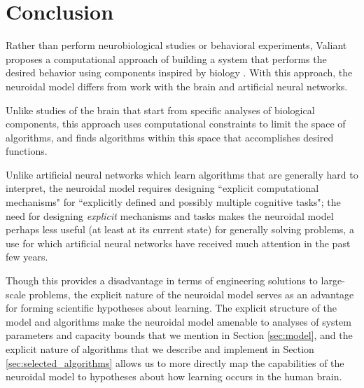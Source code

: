 \documentclass[letterpaper, 12pt]{article}
\begin{document}
\section{Conclusion}
Rather than perform neurobiological studies or behavioral experiments, Valiant proposes a computational approach of building a system that performs the desired behavior using components inspired by biology \cite{valiant_circuits_1994}. With this approach, the neuroidal model differs from work with the brain and artificial neural networks.

Unlike studies of the brain that start from specific analyses of biological components, this approach uses computational constraints to limit the space of algorithms, and finds algorithms within this space that accomplishes desired functions.

Unlike artificial neural networks which learn algorithms that are generally hard to interpret, the neuroidal model requires designing ``explicit computational mechanisms" for ``explicitly defined and possibly multiple cognitive tasks"; the need for designing \textit{explicit} mechanisms and tasks makes the neuroidal model perhaps less useful (at least at its current state) for generally solving problems, a use for which artificial neural networks have received much attention in the past few years.

Though this provides a disadvantage in terms of engineering solutions to large-scale problems, the explicit nature of the neuroidal model serves as an advantage for forming scientific hypotheses about learning. The explicit structure of the model and algorithms make the neuroidal model amenable to analyses of system parameters and capacity bounds that we mention in Section \ref{sec:model}, and the explicit nature of algorithms that we describe and implement in Section \ref{sec:selected_algorithms} allows us to more directly map the capabilities of the neuroidal model to hypotheses about how learning occurs in the human brain.



\end{document}
